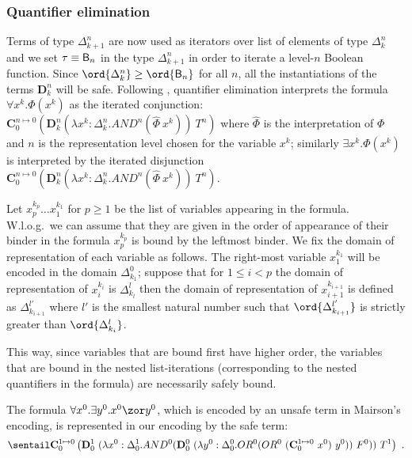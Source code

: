 \subsubsection{Quantifier elimination}
Terms of type $\Delta_{k+1}^n$ are now used as iterators over list of elements of type $\Delta_k^n$ and we set $\tau \equiv \mathsf{B}_n$ in the type $\Delta_{k+1}^n$ in order to iterate a level-$n$ Boolean function. Since $\ord{\Delta_k^n} \geq \ord{\booltype_n}$ for all $n$, all the instantiations of the terms $\mathbf{D}_k^n$ will be safe. Following \cite{mairson1992spt}, quantifier elimination interprets the formula $\forall x^k.\Phi(x^k)$ as the iterated conjunction:
$\mathbf{C}_0^{n\mapsto 0} \left( \mathbf{D}_k^n(\lambda x^k:\Delta_k^n.AND^n(\hat\Phi~x^k))~T^n \right)$ where $\hat\Phi$ is the interpretation of $\Phi$
and $n$ is the representation level chosen for the variable $x^k$; similarly $\exists x^k.\Phi(x^k)$  is interpreted by the iterated disjunction $\mathbf{C}_0^{n\mapsto 0} \left( \mathbf{D}_k^n(\lambda x^k:\Delta_k^n.AND^n(\hat\Phi~x^k))~T^n\right)$.

Let $x^{k_p}_p \ldots x^{k_1}_1$ for $p\geq1$ be the list of variables appearing in the formula. W.l.o.g.\ we can assume that they are given in the order of appearance of their binder in the formula \ie $x^{k_p}_p$ is bound by the leftmost binder. We fix the domain of representation of each variable as follows. The right-most variable $x^{k_1}_1$ will be encoded in the domain $\Delta^0_{k_1}$; suppose that for $1\leq i< p$ the domain of representation of $x^{k_i}_i$ is $\Delta^l_{k_l}$ then the domain of representation of $x^{k_{i+1}}_{i+1}$ is defined as
$\Delta^{l'}_{k_{i+1}}$ where $l'$ is the smallest natural number such that $\ord{\Delta^{l'}_{k_{i+1}}}$ is strictly greater than $\ord{\Delta^{l}_{k_i}}$.

This way, since variables that are bound first have higher order, the variables that are bound in the nested list-iterations (corresponding to the nested quantifiers in the formula) are necessarily safely bound.

\begin{example}
The formula  $\forall x^0 . \exists y^0 . x^0 \zor y^0$, which is
encoded by an unsafe term in Mairson's encoding, is represented in
our encoding by the safe term:
 $$\sentail \mathbf{C}_0^{1\mapsto 0} \left( \mathbf{D}_0^1~(\lambda x^0:\Delta_0^1. AND^0 ( \mathbf{D}_0^0 ~(\lambda y^0:\Delta_0^0. OR^0 (OR^0~(\mathbf{C}_0^{1\mapsto 0}~x^0)~y^0))~F^0))~T^1 \right)\ .$$
\end{example}


